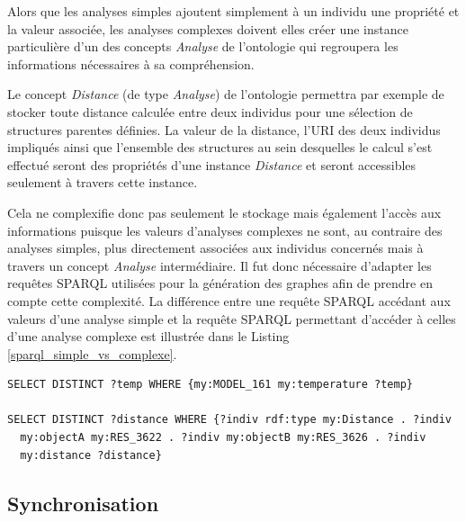Alors que les analyses simples ajoutent simplement à un individu une propriété et la valeur associée, les analyses complexes doivent elles créer une instance particulière d'un des concepts \textit{Analyse} de l'ontologie qui regroupera les informations nécessaires à sa compréhension. 

Le concept \textit{Distance} (de type \textit{Analyse}) de l'ontologie permettra par exemple de stocker toute distance calculée entre deux individus pour une sélection de structures parentes définies. La valeur de la distance, l'URI des deux individus impliqués ainsi que l'ensemble des structures au sein desquelles le calcul s'est effectué seront des propriétés d'une instance \textit{Distance} et seront accessibles seulement à travers cette instance. 

Cela ne complexifie donc pas seulement le stockage mais également l'accès aux informations puisque les valeurs d'analyses complexes ne sont, au contraire des analyses simples, plus directement associées aux individus concernés mais à travers un concept \textit{Analyse} intermédiaire. Il fut donc nécessaire d'adapter les requêtes SPARQL utilisées pour la génération des graphes afin de prendre en compte cette complexité. La différence entre une requête SPARQL accédant aux valeurs d'une analyse simple et la requête SPARQL permettant d'accéder à celles d'une analyse complexe est illustrée dans le Listing \ref{sparql_simple_vs_complexe}.

\begin{lstlisting}[language=XML, caption=Deux requêtes SPARQL : 1. Accès à la température d'un modèle 2. Accès à la distance entre deux résidus, label=sparql_simple_vs_complexe]
SELECT DISTINCT ?temp WHERE {my:MODEL_161 my:temperature ?temp}

SELECT DISTINCT ?distance WHERE {?indiv rdf:type my:Distance . ?indiv 
  my:objectA my:RES_3622 . ?indiv my:objectB my:RES_3626 . ?indiv 
  my:distance ?distance}
\end{lstlisting}

\subsection{Synchronisation}

